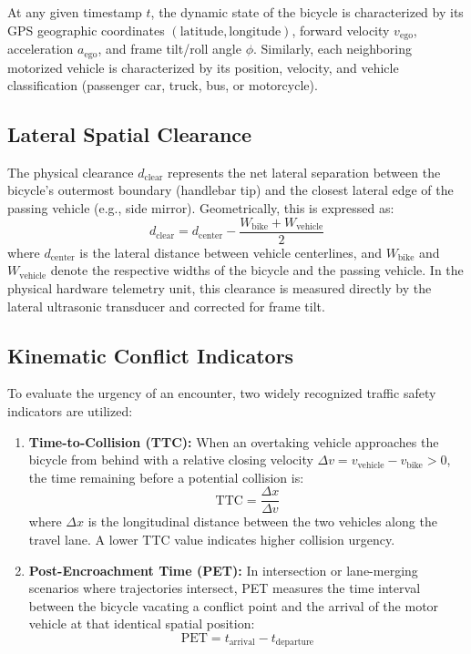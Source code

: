 At any given timestamp $t$, the dynamic state of the bicycle is characterized by its GPS geographic coordinates $(\text{latitude}, \text{longitude})$, forward velocity $v_{\text{ego}}$, acceleration $a_{\text{ego}}$, and frame tilt/roll angle $\phi$. Similarly, each neighboring motorized vehicle is characterized by its position, velocity, and vehicle classification (passenger car, truck, bus, or motorcycle).

\subsection{Lateral Spatial Clearance}
The physical clearance $d_{\text{clear}}$ represents the net lateral separation between the bicycle's outermost boundary (handlebar tip) and the closest lateral edge of the passing vehicle (e.g., side mirror). Geometrically, this is expressed as:
\begin{equation}
    d_{\text{clear}} = d_{\text{center}} - \frac{W_{\text{bike}} + W_{\text{vehicle}}}{2}
\end{equation}
where $d_{\text{center}}$ is the lateral distance between vehicle centerlines, and $W_{\text{bike}}$ and $W_{\text{vehicle}}$ denote the respective widths of the bicycle and the passing vehicle. In the physical hardware telemetry unit, this clearance is measured directly by the lateral ultrasonic transducer and corrected for frame tilt.

\subsection{Kinematic Conflict Indicators}
To evaluate the urgency of an encounter, two widely recognized traffic safety indicators are utilized:
\begin{enumerate}
    \item \textbf{Time-to-Collision (TTC):} When an overtaking vehicle approaches the bicycle from behind with a relative closing velocity $\Delta v = v_{\text{vehicle}} - v_{\text{bike}} > 0$, the time remaining before a potential collision is:
    \begin{equation}
        \text{TTC} = \frac{\Delta x}{\Delta v}
    \end{equation}
    where $\Delta x$ is the longitudinal distance between the two vehicles along the travel lane. A lower TTC value indicates higher collision urgency.
    \item \textbf{Post-Encroachment Time (PET):} In intersection or lane-merging scenarios where trajectories intersect, PET measures the time interval between the bicycle vacating a conflict point and the arrival of the motor vehicle at that identical spatial position:
    \begin{equation}
        \text{PET} = t_{\text{arrival}} - t_{\text{departure}}
    \end{equation}
\end{enumerate}

